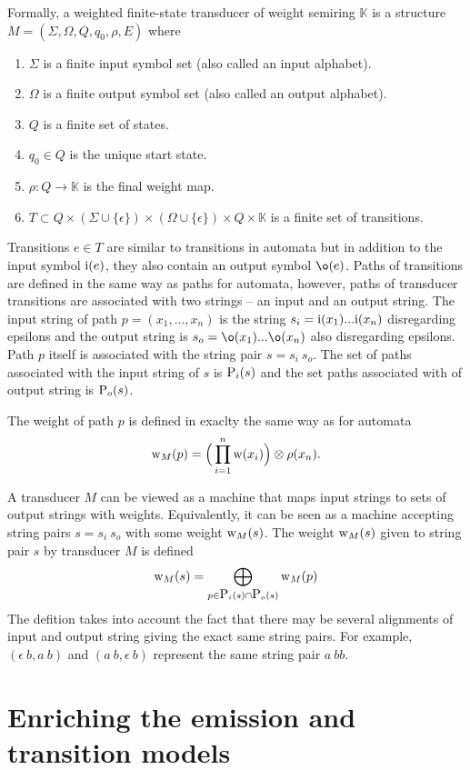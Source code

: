Formally, a weighted finite-state transducer of weight semiring
$\mathbb{K}$ is a structure $M = (\Sigma, \Omega, Q, q_0, \rho, E)$ where
\begin{enumerate}
\item $\Sigma$ is a finite input symbol set (also called an input alphabet).
\item $\Omega$ is a finite output symbol set (also called an output alphabet).
\item $Q$ is a finite set of states.
\item $q_0 \in Q$ is the unique start state.
\item $\rho: Q \rightarrow \mathbb{K}$ is the final weight map.
\item $T \subset Q \times (\Sigma \cup \{\epsilon\}) \times (\Omega \cup \{\epsilon\}) \times Q \times
\mathbb{K} $ is a finite set of transitions.
\end{enumerate}

Transitions $e \in T$ are similar to transitions in automata but in
addition to the input symbol $\i(e)$, they also contain an output
symbol $\o(e)$. Paths of transitions are defined in the same way as
paths for automata, however, paths of transducer transitions are
associated with two strings -- an input and an output string. The
input string of path $p = (x_1, ..., x_n)$ is the string $s_i =
\i(x_1) ... \i(x_n)$ disregarding epsilons and the output string is
$s_o = \o(x_1) ... \o(x_n)$ also disregarding epsilons. Path $p$
itself is associated with the string pair $s = s_i \: s_o$. The set of
paths associated with the input string of $s$ is $\P_i(s)$ and the set
paths associated with of output string is $\P_o(s)$.

The weight of path $p$ is defined in exaclty the same way as for
automata 
$$\w_M(p) = \Big( \prod_{i = 1}^n \w(x_i) \Big) \otimes \rho(x_n).$$

A transducer $M$ can be viewed as a machine that maps input strings to
sets of output strings with weights. Equivalently, it can be seen as a
machine accepting string pairs $s = s_i \: s_o$ with some weight $\w_M(s)$. The
weight $\w_M(s)$ given to string pair $s$ by transducer $M$ is defined 
$$\w_M(s) = \bigoplus_{p \in \P_i(s) \cap \P_o(s)} \w_M(p)$$
The defition takes into account the fact that there may be several
alignments of input and output string giving the exact same string
pairs. For example, $(\epsilon\:b, a\:b)$ and $(a\:b,\epsilon\:b)$
represent the same string pair $a\:bb$.

\section{Enriching the emission and transition models}

